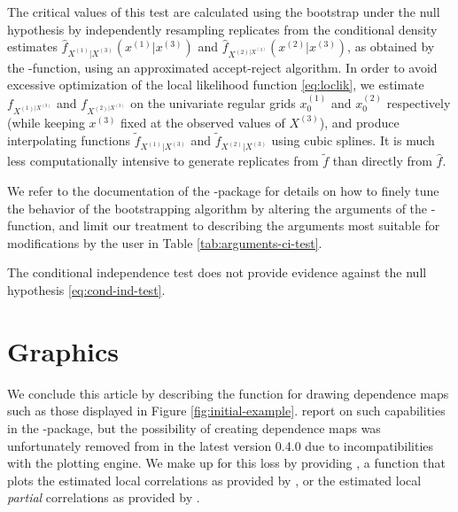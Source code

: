 The critical values of this test are calculated using the bootstrap under the null hypothesis by independently resampling replicates from
the conditional density estimates \(\widehat f_{X^{\left(1\right)}|X^{\left(3\right)}}\left(x^{\left(1\right)}|x^{\left(3\right)}\right)\) and \(\widehat f_{X^{\left(2\right)|X^{\left(3\right)}}}\left(x^{\left(2\right)}|x^{\left(3\right)}\right)\), as obtained by the -function, using an approximated accept-reject algorithm. In order to avoid excessive optimization of the local likelihood function \eqref{eq:loclik}, we estimate \(f_{X^{\left(1\right)|X^{\left(3\right)}}}\) and \(f_{X^{\left(2\right)|X^{\left(3\right)}}}\) on the univariate regular grids \(x_0^{\left(1\right)}\) and \(x_0^{\left(2\right)}\) respectively (while keeping \(x^{\left(3\right)}\) fixed at the observed values of \(X^{\left(3\right)}\)), and produce interpolating functions \(\tilde f_{X^{\left(1\right)}|X^{\left(3\right)}}\) and \(\tilde f_{X^{\left(2\right)}|X^{\left(3\right)}}\) using cubic splines. It is much less computationally intensive to generate replicates from \(\tilde f\) than directly from \(\widehat f\).

We refer to the documentation of the -package for details on how to finely tune the behavior of the bootstrapping algorithm by altering the arguments of the -function, and limit our treatment to describing the arguments most suitable for modifications by the user in Table \ref{tab:arguments-ci-test}.

The conditional independence test does not provide evidence against the null hypothesis \eqref{eq:cond-ind-test}.

\section{Graphics}\label{chap:graphics}

We conclude this article by describing the  function for drawing dependence maps such as those displayed in Figure \ref{fig:initial-example}. \cite{bere:klep:tjos:2014} report on such capabilities in the -package, but the possibility of creating dependence maps was unfortunately removed from  in the latest version 0.4.0 due to incompatibilities with the  \citep{wick:2016} plotting engine. We make up for this loss by providing , a function that plots the estimated local correlations as provided by , or the estimated local \emph{partial} correlations as provided by .

